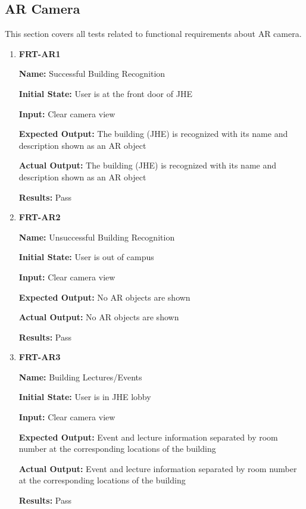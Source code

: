 \documentclass[12pt, titlepage]{article}
\begin{document}
\subsection{AR Camera}
This section covers all tests related to functional requirements about AR camera.
\begin{enumerate}
\item \textbf{FRT-AR1}

\textbf{Name:} Successful Building Recognition

\textbf{Initial State:} User is at the front door of JHE

\textbf{Input:} Clear camera view
					
\textbf{Expected Output:} The building (JHE) is recognized with its name and description shown as an AR object

\textbf{Actual Output:} The building (JHE) is recognized with its name and description shown as an AR object

\textbf{Results:} Pass

\item \textbf{FRT-AR2}

\textbf{Name:} Unsuccessful Building Recognition

\textbf{Initial State:} User is out of campus

\textbf{Input:} Clear camera view
					
\textbf{Expected Output:} No AR objects are shown

\textbf{Actual Output:} No AR objects are shown

\textbf{Results:} Pass

\item \textbf{FRT-AR3}

\textbf{Name:} Building Lectures/Events

\textbf{Initial State:} User is in JHE lobby

\textbf{Input:} Clear camera view
					
\textbf{Expected Output:} Event and lecture information separated by room number at the corresponding locations of the building

\textbf{Actual Output:} Event and lecture information separated by room number at the corresponding locations of the building

\textbf{Results:} Pass
\end{enumerate}
\end{document}
